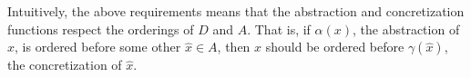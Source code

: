 \documentclass[10pt]{article}
\begin{document}
Intuitively, the above requirements means that the abstraction and concretization functions respect the orderings of $D$ and $A$. That is, if $\alpha(x)$, the abstraction of $x$, is ordered before some other $\hat{x} \in A$, then $x$ should be ordered before $\gamma(\hat{x})$, the concretization of $\hat{x}$.

\end{document}
